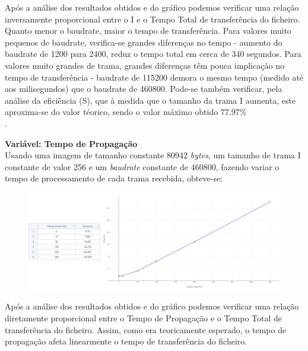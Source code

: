 \documentclass[a4paper, 11pt]{article}
\begin{document}
Após a análise dos resultados obtidos e do gráfico podemos verificar uma relação inversamente proporcional entre o  I e o Tempo Total de transferência do ficheiro. Quanto menor o baudrate, maior o tempo de transferência.  Para valores muito pequenos de baudrate, verifica-se grandes diferenças no tempo - aumento do baudrate de 1200 para 2400, reduz o tempo total em cerca de 340 segundos. Para valores muito grandes de trama, grandes diferenças têm pouca implicação no tempo de transferência - baudrate de  115200 demora o mesmo tempo (medido até aos milisegundos) que o baudrate de 460800. Pode-se também verificar, pela análise da eficiência (S), que à medida que o tamanho da trama I aumenta, este aproxima-se do valor téorico, sendo o valor máximo obtido 77.97\%\\.

\textbf{Variável: Tempo de Propagação}\\
Usando uma imagem de tamanho constante 80942 \textit{bytes}, um tamanho de trama I constante de valor 256 e um \textit{baudrate} constante de 460800, fazendo variar o tempo de processamento de cada trama recebida, obteve-se:
\begin{figure}[h!]
\begin{center}
\includegraphics[scale=0.3]{images/TProp.png}
\end{center}
\end{figure}

Após a análise dos resultados obtidos e do gráfico podemos verificar uma relação diretamente proporcional entre o Tempo de Propagação e o Tempo Total de transferência do ficheiro. Assim, como era teoricamente esperado, o tempo de propagação afeta linearmente o tempo de transferência do ficheiro.
\end{document}
